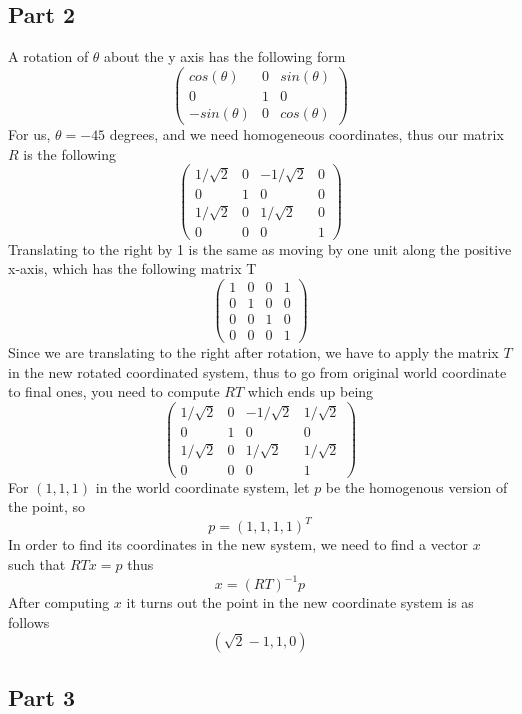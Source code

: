 \documentclass[11pt,psfig]{article}
\begin{document}
\newpage

\subsection{Part 2}

A rotation of $\theta$ about the y axis has the following form
\[ \left( \begin{array}{ccc}
cos(\theta) & 0 & sin(\theta) \\
0 & 1 & 0 \\
-sin(\theta) & 0 & cos(\theta) \end{array} \right)\]
For us, $\theta=-45$ degrees, and we need homogeneous coordinates, thus our matrix $R$ is the following
\[ \left( \begin{array}{cccc}
1/\sqrt{2} & 0 & -1/\sqrt{2} & 0 \\
0 & 1 & 0 & 0\\
1/\sqrt{2} & 0 & 1/\sqrt{2} & 0 \\
0 & 0 & 0 & 1 \end{array} \right)\]
Translating to the right by 1 is the same as moving by one unit along the positive x-axis, which has the following matrix T 
\[ \left( \begin{array}{cccc}
1 & 0 & 0 & 1 \\
0 & 1 & 0 & 0\\
0 & 0 & 1 & 0 \\
0 & 0 & 0 & 1 \end{array} \right)\]
Since we are translating to the right after rotation, we have to apply the matrix $T$ in the new rotated coordinated system, thus to go from original world coordinate to final ones, you need to compute $RT$ which ends up being
\[ \left( \begin{array}{cccc}
1/\sqrt{2} & 0 & -1/\sqrt{2} & 1/\sqrt{2} \\
0 & 1 & 0 & 0\\
1/\sqrt{2} & 0 & 1/\sqrt{2} & 1/\sqrt{2} \\
0 & 0 & 0 & 1 \end{array} \right)\]
For $(1,1,1)$ in the world coordinate system, let $p$ be the homogenous version of the point, so 
\[
p=(1,1,1,1)^T
\]
In order to find its coordinates in the new system, we need to find a vector $x$ such that $RTx=p$ thus 
\[
x=(RT)^{-1} p
\] 
After computing $x$ it turns out the point in the new coordinate system is as follows
\[
(\sqrt{2} - 1, 1,0)
\]

\newpage

\subsection{Part 3}
\end{document}
